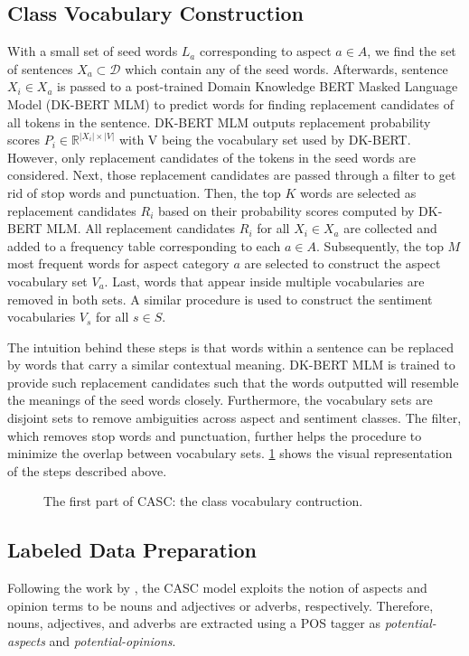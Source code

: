 \documentclass[american, oneside]{ecsgdp}
\begin{document}
\subsection{Class Vocabulary Construction}
With a small set of seed words $L_a$ corresponding to aspect $a \in A$, we find the set of sentences $X_a \subset \mathcal{D}$ which contain any of the seed words. Afterwards, sentence $X_i \in X_a$ is passed to a post-trained Domain Knowledge BERT Masked Language Model (DK-BERT MLM) to predict words for finding replacement candidates of all tokens in the sentence. DK-BERT MLM outputs replacement probability scores $P_i \in \mathbb{R}^{\lvert X_i \rvert \times \lvert V \rvert}$ with V being the vocabulary set used by DK-BERT. However, only replacement candidates of the tokens in the seed words are considered. Next, those replacement candidates are passed through a filter to get rid of stop words and punctuation. Then, the top $K$ words are selected as replacement candidates $R_i$ based on their probability scores computed by DK-BERT MLM. All replacement candidates $R_i$ for all $X_i \in X_a$ are collected and added to a frequency table corresponding to each $a \in A$. Subsequently, the top $M$ most frequent words for aspect category $a$ are selected to construct the aspect vocabulary set $V_a$. Last, words that appear inside multiple vocabularies are removed in both sets. A similar procedure is used to construct the sentiment vocabularies $V_s$ for all $s \in S$.

The intuition behind these steps is that words within a sentence can be replaced by words that carry a similar contextual meaning. DK-BERT MLM is trained to provide such replacement candidates such that the words outputted will resemble the meanings of the seed words closely. Furthermore, the vocabulary sets are disjoint sets to remove ambiguities across aspect and sentiment classes. The filter, which removes stop words and punctuation, further helps the procedure to minimize the overlap between vocabulary sets. \cref{fig:casc1} shows the visual representation of the steps described above.

\begin{figure}[htbp]
  \centering
  
  \caption{The first part of CASC: the class vocabulary contruction.}
  \label{fig:casc1}
\end{figure}

\subsection{Labeled Data Preparation} \label{sec:labeler}
Following the work by \textcite{Hu2004Rules}, the CASC model exploits the notion of aspects and opinion terms to be nouns and adjectives or adverbs, respectively. Therefore, nouns, adjectives, and adverbs are extracted using a POS tagger as \textit{potential-aspects} and \textit{potential-opinions}.
\end{document}
